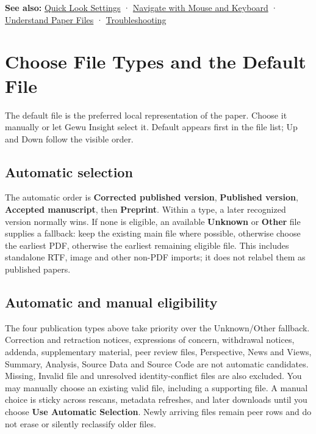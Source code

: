\documentclass[10pt,letterpaper,oneside]{scrreprt}
\newenvironment{GewuRelated}{\par\nobreak\vspace{3pt}\nobreak\begingroup\small\sffamily\begin{samepage}\noindent}{\par\end{samepage}\endgroup}
\newenvironment{GewuLead}
  {\begin{list}{}{\leftmargin=0pt\rightmargin=0pt\topsep=0pt\partopsep=0pt\parsep=0pt}\item\relax
    \sffamily\fontsize{10.5}{13.2}\selectfont\color{GewuMuted}}
  {\end{list}}
\begin{document}
\begin{GewuRelated}
\textbf{See also:} \hyperref[quick-look-settings]{Quick Look Settings} · \hyperref[navigation]{Navigate with Mouse and Keyboard} · \hyperref[paper-files]{Understand Paper Files} · \hyperref[troubleshooting]{Troubleshooting}
\end{GewuRelated}

\section{Choose File Types and the Default File}\label{versions-current}

\begin{GewuLead}
The default file is the preferred local representation of the paper. Choose it manually or let Gewu Insight select it. Default appears first in the file list; Up and Down follow the visible order.
\end{GewuLead}

\subsection{Automatic selection}\label{automatic-selection}

The automatic order is \textbf{Corrected published version}, \textbf{Published version}, \textbf{Accepted manuscript}, then \textbf{Preprint}. Within a type, a later recognized version normally wins. If none is eligible, an available \textbf{Unknown} or \textbf{Other} file supplies a fallback: keep the existing main file where possible, otherwise choose the earliest PDF, otherwise the earliest remaining eligible file. This includes standalone RTF, image and other non-PDF imports; it does not relabel them as published papers.

\subsection{Automatic and manual eligibility}\label{automatic-and-manual-eligibility}

The four publication types above take priority over the Unknown/Other fallback. Correction and retraction notices, expressions of concern, withdrawal notices, addenda, supplementary material, peer review files, Perspective, News and Views, Summary, Analysis, Source Data and Source Code are not automatic candidates. Missing, Invalid file and unresolved identity-conflict files are also excluded. You may manually choose an existing valid file, including a supporting file. A manual choice is sticky across rescans, metadata refreshes, and later downloads until you choose \textbf{Use Automatic Selection}. Newly arriving files remain peer rows and do not erase or silently reclassify older files.
\end{document}
